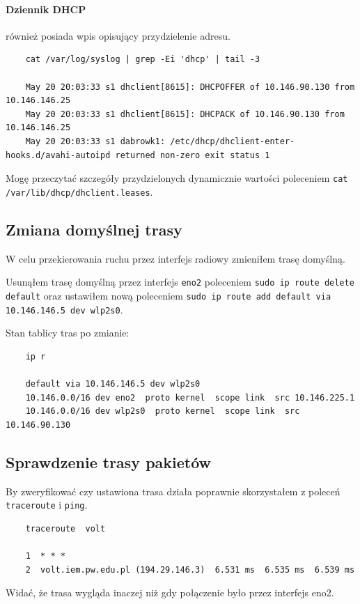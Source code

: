 \documentclass{mwart} %
\begin{document}
\paragraph{Dziennik DHCP} również posiada wpis opisujący przydzielenie adresu.
\begin{verbatim}
    cat /var/log/syslog | grep -Ei 'dhcp' | tail -3

    May 20 20:03:33 s1 dhclient[8615]: DHCPOFFER of 10.146.90.130 from 10.146.146.25 
    May 20 20:03:33 s1 dhclient[8615]: DHCPACK of 10.146.90.130 from 10.146.146.25
    May 20 20:03:33 s1 dabrowk1: /etc/dhcp/dhclient-enter-hooks.d/avahi-autoipd returned non-zero exit status 1
\end{verbatim}

Mogę przeczytać szczegóły przydzielonych dynamicznie wartości poleceniem \texttt{cat /var/lib/dhcp/dhclient.leases}.

\subsection*{Zmiana domyślnej trasy}
W celu przekierowania ruchu przez interfejs radiowy zmieniłem trasę domyślną.

Usunąłem trasę domyślną przez interfejs \texttt{eno2} poleceniem \texttt{sudo ip route delete default} oraz ustawiłem nową poleceniem \texttt{sudo ip route add default via 10.146.146.5 dev wlp2s0}.
\vspace{2mm}

Stan tablicy tras po zmianie:
\begin{verbatim}
    ip r

    default via 10.146.146.5 dev wlp2s0  
    10.146.0.0/16 dev eno2  proto kernel  scope link  src 10.146.225.1
    10.146.0.0/16 dev wlp2s0  proto kernel  scope link  src 10.146.90.130
\end{verbatim}

\subsection*{Sprawdzenie trasy pakietów}
By zweryfikować czy ustawiona trasa działa poprawnie skorzystałem z poleceń \texttt{traceroute} i \texttt{ping}.

\begin{verbatim}
    traceroute  volt

    1  * * * 
    2  volt.iem.pw.edu.pl (194.29.146.3)  6.531 ms  6.535 ms  6.539 ms
\end{verbatim}
Widać, że trasa wygląda inaczej niż gdy połączenie było przez interfejs eno2.
\end{document}
